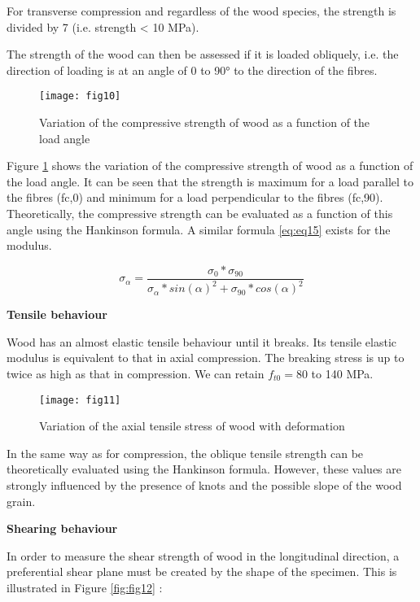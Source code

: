 For transverse compression and regardless of the wood species, the strength is divided by 7 (i.e. strength < 10 MPa). 

The strength of the wood can then be assessed if it is loaded obliquely, i.e. the direction of loading is at an angle of 0 to 90° to the direction of the fibres. 


\begin{figure}[htp]
	\centering
	\texttt{[image: fig10]}
	\caption{Variation of the compressive strength of wood as a function of the load angle}
	\label{fig:fig10}
\end{figure}

Figure \ref{fig:fig10} shows the variation of the compressive strength of wood as a function of the load angle. It can be seen that the strength is maximum for a load parallel to the fibres (fc,0) and minimum for a load perpendicular to the fibres (fc,90). Theoretically, the compressive strength can be evaluated as a function of this angle using the Hankinson formula. A similar formula \ref{eq:eq15} exists for the modulus.

\begin{equation}
	\sigma_{\alpha} = \frac{\sigma_{0}*\sigma_{90}}{\sigma_{\alpha}*sin(\alpha)^2+\sigma_{90}*cos(\alpha)^2}
	\label{eq:eq15}
\end{equation}

\textbf{Tensile behaviour}

Wood has an almost elastic tensile behaviour until it breaks. Its tensile elastic modulus is equivalent to that in axial compression. The breaking stress is up to twice as high as that in compression. We can retain $f_{t0}=80$ to 140 MPa.


\begin{figure}[htp]
	\centering
	\texttt{[image: fig11]}
	\caption{Variation of the axial tensile stress of wood with deformation}
	\label{fig:galaxy}
\end{figure}

In the same way as for compression, the oblique tensile strength can be theoretically evaluated using the Hankinson formula. However, these values are strongly influenced by the presence of knots and the possible slope of the wood grain.

\smallskip

\textbf{Shearing behaviour}

In order to measure the shear strength of wood in the longitudinal direction, a preferential shear plane must be created by the shape of the specimen. This is illustrated in Figure \ref{fig:fig12} :


